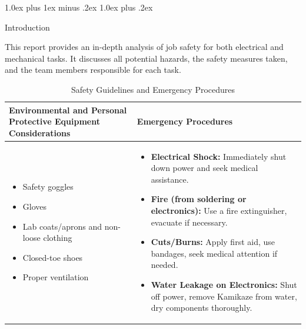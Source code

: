 \documentclass[conference , 12pt]{IEEEtran}
\makeatletter
\def\section{\@startsection {section}{1}{\z@}%
    {1.0ex plus 1ex minus .2ex}%
    {1.0ex plus .2ex}%
    {\normalfont\normalsize\bfseries\raggedright}}
\makeatother
\begin{document}
\onecolumn

\section{Introduction}

This report provides an in-depth analysis of job safety for both electrical and
mechanical tasks. It discusses all potential hazards, the safety measures
taken, and the team members responsible for each task.

\begin{table}[h]
    \centering
    \setlength{\arrayrulewidth}{1pt} %
    \setlength{\tabcolsep}{10pt} %
    \begin{tabular}{|p{7cm}|p{7cm}|}
        \hline
        \rowcolor{gray!20} \textbf{Environmental and Personal Protective Equipment Considerations} & \textbf{Emergency Procedures} \\
        \hline
        \begin{itemize}[leftmargin=*]
            \item Safety goggles
            \item Gloves
            \item Lab coats/aprons and non-loose clothing
            \item Closed-toe shoes
            \item Proper ventilation
        \end{itemize}
                                                                                                   &
        \begin{itemize}[leftmargin=*]
            \item \textbf{Electrical Shock:} Immediately shut down power and seek medical assistance.
            \item \textbf{Fire (from soldering or electronics):} Use a fire extinguisher, evacuate if necessary.
            \item \textbf{Cuts/Burns:} Apply first aid, use bandages, seek medical attention if needed.
            \item \textbf{Water Leakage on Electronics:} Shut off power, remove Kamikaze from water, dry components thoroughly.
        \end{itemize}         \\
        \hline
    \end{tabular}
    \caption{Safety Guidelines and Emergency Procedures}
\end{table}
\end{document}
